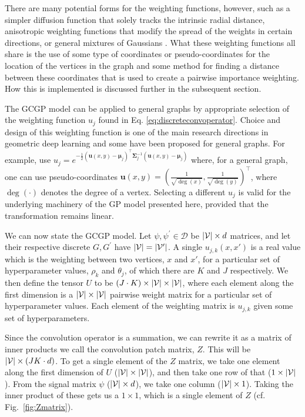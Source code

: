 \documentclass{article}
\DeclarePairedDelimiter\abs{\lvert}{\rvert}\DeclarePairedDelimiter\norm{\lVert}{\rVert}\newcommand{\p}[1]{\left(#1\right)}
\begin{document}
There are many potential forms for the weighting functions, however, such as a simpler diffusion function that solely tracks the intrinsic radial distance, anisotropic weighting functions that modify the spread of the weights in certain directions, or general mixtures of Gaussians \citep{moNet}. What these weighting functions all share is the use of some type of coordinates or pseudo-coordinates for the location of the vertices in the graph and some method for finding a distance between these coordinates that is used to create a pairwise importance weighting. How this is implemented is discussed further in the subsequent section.

The GCGP model can be applied to general graphs by appropriate selection of the weighting function $u_j$ found in Eq. \eqref{eq:discreteconvoperator}. Choice and design of this weighting function is one of the main research directions in geometric deep learning and some have been proposed for general graphs. For example, \citet{moNet} use $u_j = e^{-\frac{1}{2} (\mathbf{u}(x,y)-\mathbf{\mu}_j)^\top \mathbf{\Sigma}_j^{-1}(\mathbf{u}(x,y)-\mathbf{\mu}_j)}$ where, for a general graph, one can use pseudo-coordinates $\mathbf{u}(x,y) = \left(\frac{1}{\sqrt{\deg(x)}}, \frac{1}{\sqrt{\deg(y)}}\right)^\top$, where $\deg(\cdot)$ denotes the degree of a vertex. Selecting a different $u_j$ is valid for the underlying machinery of the GP model presented here, provided that the transformation remains linear.

We can now state the GCGP model. Let $\psi, \psi^\prime \in \mathcal{D}$ be $\abs{\mathcal{V}}\times d$ matrices, and let their respective discrete $G, G^\prime$ have $\abs{\mathcal{V}} = \abs{\mathcal{V^\prime}}$. A single $u_{j,k}(x,x')$ is a real value which is the weighting between two vertices, $x$ and $x'$, for a particular set of hyperparameter values, $\rho_k$ and $\theta_j$, of which there are $K$ and $J$ respectively. We then define the tensor $U$ to be $(J \cdot K) \times \abs{\mathcal{V}} \times \abs{\mathcal{V}}$, where each element along the first dimension is a $\abs{\mathcal{V}} \times \abs{\mathcal{V}}$ pairwise weight matrix for a particular set of hyperparameter values. Each element of the weighting matrix is $u_{j,k}$ given some set of hyperparameters.

Since the convolution operator is a summation, we can rewrite it as a matrix of inner products we call the convolution patch matrix, $Z$. This will be $\abs{\mathcal{V}} \times (JK \cdot d)$. To get a single element of the $Z$ matrix, we take one element along the first dimension of $U$ ($\abs{\mathcal{V}} \times \abs{\mathcal{V}}$), and then take one row of that ($1 \times \abs{\mathcal{V}}$). From the signal matrix $\psi$ ($\abs{\mathcal{V}} \times d$), we take one column ($\abs{\mathcal{V}} \times 1$). Taking the inner product of these gets us a $1\!\times\!1$, which is a single element of $Z$ (cf. Fig.~\ref{fig:Zmatrix}).
\end{document}
